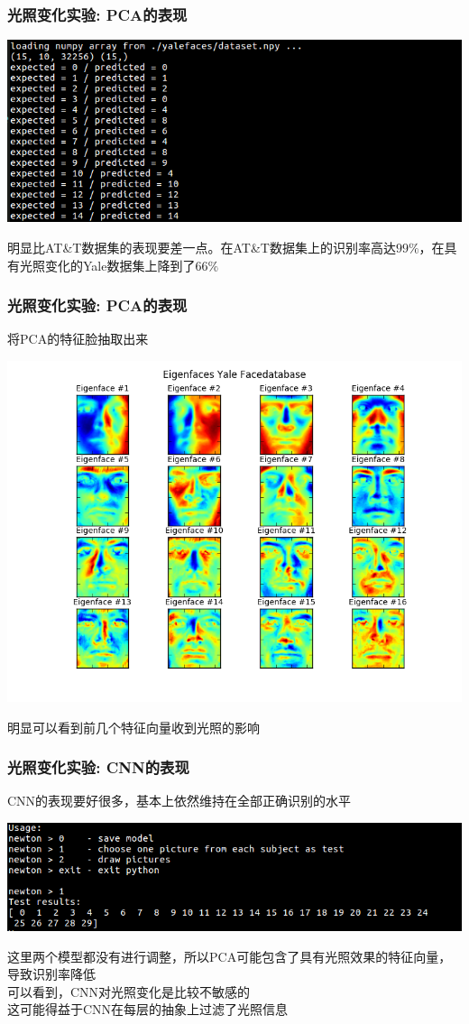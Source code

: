\documentclass[24pt]{beamer}
\begin{document}
\begin{frame}
\frametitle{光照变化实验: PCA的表现}
\begin{center}
\includegraphics[width=1\linewidth]{./fig26.png}
\end{center}
明显比AT\&T数据集的表现要差一点。在AT\&T数据集上的识别率高达$99\%$，在具有光照变化的Yale数据集上降到了$66\%$
\end{frame}
\begin{frame}
\frametitle{光照变化实验: PCA的表现}
将PCA的特征脸抽取出来
\begin{center}
\includegraphics[width=0.65\linewidth]{../image/eigenfacesYale.png}
\end{center}
明显可以看到前几个特征向量收到光照的影响
\end{frame}
\begin{frame}
\frametitle{光照变化实验: CNN的表现}
CNN的表现要好很多，基本上依然维持在全部正确识别的水平
\begin{center}
\includegraphics[width=1\linewidth]{./fig27.png}
\end{center}
这里两个模型都没有进行调整，所以PCA可能包含了具有光照效果的特征向量，导致识别率降低\\
可以看到，CNN对光照变化是比较不敏感的\\
这可能得益于CNN在每层的抽象上过滤了光照信息
\end{frame}
\end{document}
